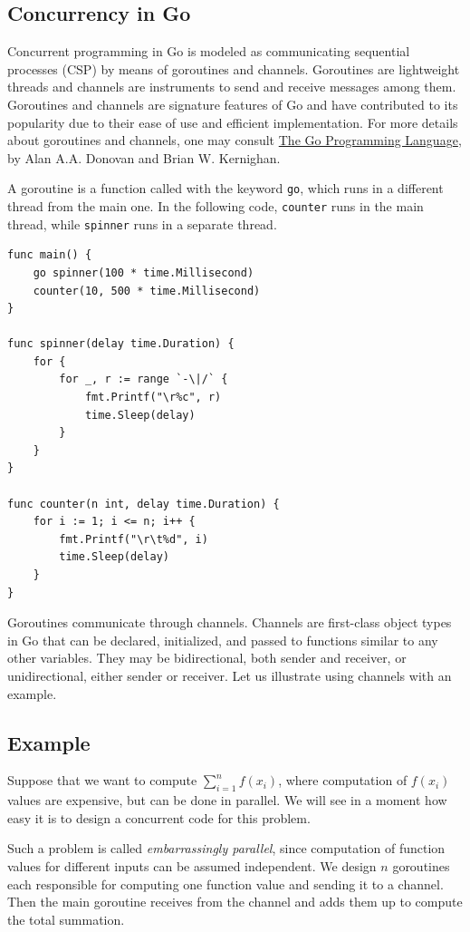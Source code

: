 \documentclass[11pt]{article}
\begin{document}
\subsection*{Concurrency in Go}
\label{sec:orgheadline3}
Concurrent programming in Go is modeled as communicating sequential processes (CSP) by means of goroutines and channels. Goroutines are lightweight threads and channels are instruments to send and receive messages among them. Goroutines and channels are signature features of Go and have contributed to its popularity due to their ease of use and efficient implementation. For more details about goroutines and channels, one may consult \href{https://dl.acm.org/citation.cfm?id=2851099}{The Go Programming Language}, by Alan A.A. Donovan and Brian W. Kernighan.

A goroutine is a function called with the keyword \texttt{go}, which runs in a different thread from the main one. In the following code, \texttt{counter} runs in the main thread, while \texttt{spinner} runs in a separate thread.
\begin{verbatim}
func main() {
	go spinner(100 * time.Millisecond)
	counter(10, 500 * time.Millisecond)
}

func spinner(delay time.Duration) {
	for {
		for _, r := range `-\|/` {
			fmt.Printf("\r%c", r)
			time.Sleep(delay)
		}
	}
}

func counter(n int, delay time.Duration) {
	for i := 1; i <= n; i++ {
		fmt.Printf("\r\t%d", i)
		time.Sleep(delay)
	}
}
\end{verbatim}
Goroutines communicate through channels. Channels are first-class object types in Go that can be declared, initialized, and passed to functions similar to any other variables. They may be bidirectional, both sender and receiver, or unidirectional, either sender or receiver. Let us illustrate using channels with an example.

\subsection*{Example}
\label{sec:orgheadline4}
Suppose that we want to compute \(\sum_{i=1}^nf(x_i)\), where computation of \(f(x_i)\) values are expensive, but can be done in parallel. We will see in a moment how easy it is to design a concurrent code for this problem.

Such a problem is called \emph{embarrassingly parallel}, since computation of function values for different inputs can be assumed independent. We design \(n\) goroutines each responsible for computing one function value and sending it to a channel. Then the main goroutine receives from the channel and adds them up to compute the total summation.
\end{document}
